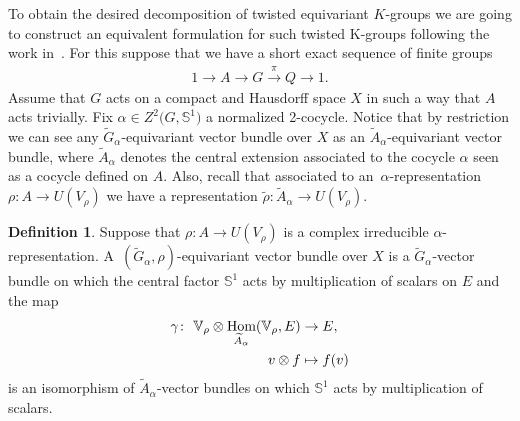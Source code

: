 \documentclass[pdftex]{sigma}
\def\S{\mathbb{S}}
\def\V{\mathbb{V}}
\DeclareMathOperator{\Hom}{\textup{Hom}}
\theoremstyle{definition}
\newtheorem{Def}[Th]{Definition}
\numberwithin{equation}{section}
\begin{document}
To obtain the desired decomposition of twisted equivariant $K$-groups we are going to construct an equivalent
formulation for such twisted K-groups following the work in~\cite{GomezUribe}. For this suppose
that we have a short exact sequence of finite groups
\begin{gather*}
1\rightarrow A\rightarrow G\stackrel{\pi}{\rightarrow} Q\rightarrow 1.
\end{gather*}
Assume that $G$ acts on a compact and Hausdorff space $X$ in such a way that $A$ acts trivially.
Fix $\alpha\in Z^{2}\big(G,\S^{1}\big)$ a normalized 2-cocycle. Notice that by restriction we can
see any $\widetilde{G}_{\alpha}$-equivariant vector bundle over $X$ as an
$\widetilde{A}_{\alpha}$-equivariant vector bundle, where $\widetilde{A}_{\alpha}$ denotes the
central extension associated to the cocycle $\alpha$ seen as a cocycle defined on $A$.
Also, recall that associated to an~$\alpha$-representation $\rho\colon A \rightarrow U(V_{\rho})$ we have a representation
$\tilde{\rho}\colon \widetilde{A}_{\alpha} \rightarrow U(V_{\rho})$.

{\sloppy\begin{Def}
Suppose that $\rho\colon A \rightarrow U(V_{\rho})$ is a complex irreducible $\alpha$-representation.
A~$(\widetilde{G}_{\alpha}, \rho)$-equivariant vector bundle over $X$ is a
$\widetilde{G}_{\alpha}$-vector bundle on which the central factor $\S^{1}$ acts
by multiplication of scalars on $E$ and the map
\begin{align*}
\gamma\colon\ \V_{\rho}\otimes \Hom_{\widetilde{A}_{\alpha}}(\V_{\rho},E)&\rightarrow E,
\\
v\otimes f &\mapsto f(v)
\end{align*}
is an isomorphism of $\widetilde{A}_{\alpha}$-vector bundles on which $\S^{1}$ acts
by multiplication of scalars.
\end{Def}

}
\end{document}
